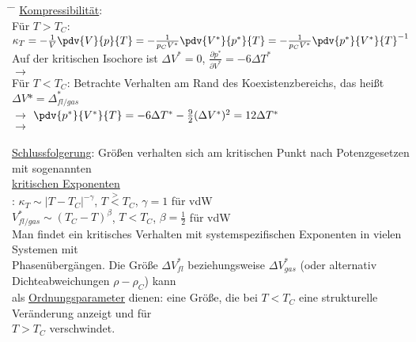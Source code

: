 \begin{figure}[H]
  \centering
\end{figure}
\begin{tabbing}
\hspace{4em} \= \hspace{4em} \= \kill
\underline{Kompressibilität}:\\
Für $T>T_C$:\>\> $\kappa_T = -\frac1V\pdv{V}{p}{T} = -\frac{1}{p_C V^{*}}\pdv{V^{*}}{p^{*}}{T} = -\frac{1}{p_C V^{*}}\pdv{p^{*}}{V^{*}}{T}^{-1}$\\
\> Auf der kritischen Isochore ist $\Delta V^{*} = 0$, $\frac{\partial p^{*}}{\partial V^{*}} = - 6 \Delta T^{*}$\\
$\rightarrow$\> \\
Für $T< T_C$:\>\> Betrachte Verhalten am Rand des Koexistenzbereichs, das heißt $\Delta V {*} = \Delta^{*}_{fl/gas}$\\
$\rightarrow$\> $\pdv{p^{*}}{V^{*}}{T} = -6 \Delta T^{*} - \frac92 (\Delta V^{*})^2 = 12 \Delta T^{*}$\\
$\rightarrow$\> \\
\\
\underline{Schlussfolgerung}: Größen verhalten sich am kritischen Punkt nach Potenzgesetzen mit sogenannten\\
\underline{kritischen Exponenten}\\
:\> $\kappa_T\sim |T-T_C|^{-\gamma}$, $T\stackrel{\displaystyle >}{<} T_C$, $\gamma = 1$ für vdW\\
\> $V^{*}_{fl/gas} \sim (T_C-T)^{\beta}$, $T <T_C$, $\beta = \frac12$ für vdW\\
Man findet ein kritisches Verhalten mit systemspezifischen Exponenten in vielen Systemen mit\\ Phasenübergängen. Die Größe $\Delta V^{*}_{fl}$ beziehungsweise $\Delta V^{*}_{gas}$ (oder alternativ Dichteabweichungen $\rho - \rho_C$) kann\\ als \underline{Ordnungsparameter} dienen: eine Größe, die bei $T < T_C$ eine strukturelle Veränderung anzeigt und für\\ $T> T_C$ verschwindet.
\end{tabbing}


